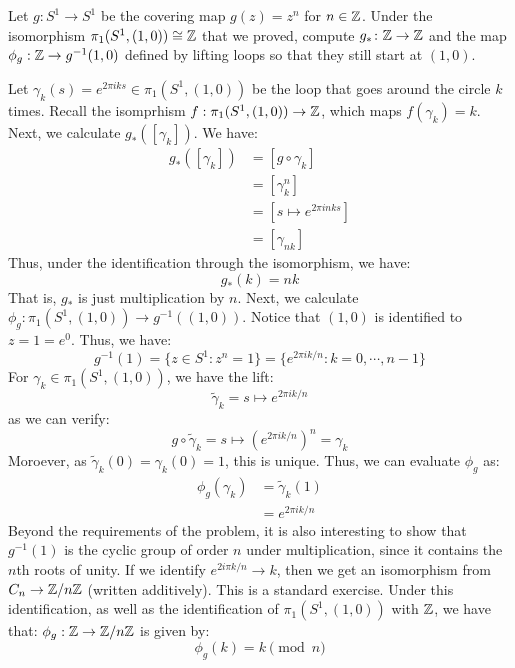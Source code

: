 \documentclass[12pt]{article}
\begin{document}
\begin{problem}{2}
    Let $g\colon S^1 \to S^1$ be the covering map $g(z) = z^n$ for $n \in \mathbb{Z}$. Under the isomorphism $\pi_1(S^1, (1,0)) \cong \mathbb{Z}$ that we proved, compute $g_* \colon \mathbb{Z} \to \mathbb{Z}$ and the map $\phi_g: \mathbb{Z} \to g^{-1}(1,0)$ defined by lifting loops so that they still start at $(1,0)$.
\end{problem}
\begin{solution}
    Let $\gamma_k(s) = e^{2\pi i ks} \in \pi_1(S^1, (1, 0))$ be the loop that goes around the circle $k$ times. Recall the isomprhism $f: \pi_1(S^1, (1,0)) \to \mathbb{Z}$, which maps $f(\gamma_k) = k$. \bbni
    Next, we calculate $g_*([\gamma_k])$. We have:
    \begin{align*}
        g_*([\gamma_k]) &= [g \circ \gamma_k] \\
        &= [\gamma_k^n] \\
        &= [s \mapsto e^{2\pi i nk s}] \\
        &= [\gamma_{nk}]
    \end{align*}
    Thus, under the identification through the isomorphism, we have:
    \[g_*(k) = nk\]
    That is, $g_*$ is just multiplication by $n$.\bbni
    Next, we calculate $\phi_g: \pi_1(S^1, (1, 0)) \to g^{-1}((1,0))$. Notice that $(1,0)$ is identified to $z = 1 = e^0$. Thus, we have: 
    \[ g^{-1}(1) = \{z \in S^1: z^n = 1\} = \{e^{2\pi i k/n}: k = 0, \cdots, n-1\}\]
    For $\gamma_k \in \pi_1(S^1, (1,0))$, we have the lift: 
    \[\tilde{\gamma}_k = s \mapsto e^{2\pi i k/n}\]
    as we can verify: 
    \[ g \circ \tilde{\gamma}_k = s \mapsto (e^{2\pi i k/n})^n = \gamma_k\]
    Moroever, as $\tilde{\gamma}_k(0) = \gamma_k(0) = 1$, this is unique. Thus, we can evaluate $\phi_g$ as:
    \begin{align*}
        \phi_g(\gamma_k) &= \tilde{\gamma}_k(1) \\
        &= e^{2\pi i k/n}
    \end{align*}
    Beyond the requirements of the problem, it is also interesting to show that $g^{-1}(1)$ is the cyclic group of order $n$ under multiplication, since it contains the $n$th roots of unity. If we identify $e^{2i\pi k/n} \to k$, then we get an isomorphism from $C_n \to \mathbb Z/n\mathbb Z$ (written additively). This is a standard exercise. Under this identification, as well as the identification of $\pi_1(S^1, (1,0))$ with $\mathbb Z$, we have that: $\phi_g: \mathbb Z \to \mathbb Z/n\mathbb Z$ is given by:
    \[ \phi_g(k) = k\pmod n\]
\end{solution}
\newpage
\end{document}
